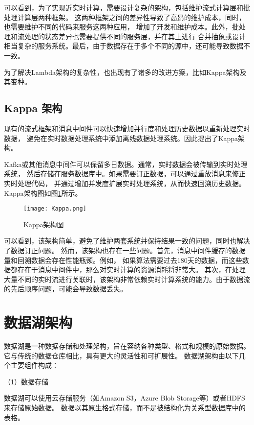可以看到，为了实现近实时计算，需要设计复杂的架构，包括维护流式计算层和批处理计算层两种框架。
这两种框架之间的差异性导致了高昂的维护成本，同时，也需要维护不同的代码来服务这两种应用，
增加了开发和维护成本。此外，批处理和流处理的状态差异也需要提供不同的服务层，并在其上进行
合并抽象或设计相当复杂的服务系统。最后，由于数据存在于多个不同的源中，还可能导致数据不一致。

为了解决Lambda架构的复杂性，也出现有了诸多的改进方案，比如Kappa架构及其变种。

\subsection{Kappa 架构}

现有的流式框架和消息中间件可以快速增加并行度和处理历史数据以重新处理实时数据，
避免在实时数据处理系统中添加离线数据处理系统。因此提出了Kappa架构\cite{4}。

Kafka或其他消息中间件可以保留多日数据。通常，实时数据会被传输到实时处理系统，
然后存储在服务数据库中。如果需要订正数据，可以通过重放消息来修正实时处理代码，
并通过增加并发度扩展实时处理系统，从而快速回溯历史数据。Kappa架构图如图\ref{fig:Kappa架构图}所示。

\begin{figure}[H]
  \centering
  \texttt{[image: Kappa.png]}
  \caption{Kappa架构图}
  \label{fig:Kappa架构图}
\end{figure}

可以看到，该架构简单，避免了维护两套系统并保持结果一致的问题，同时也解决了数据订正问题。
然而，该架构也存在一些问题。首先，消息中间件缓存的数据量和回溯数据会存在性能瓶颈。例如，
如果算法需要过去180天的数据，而这些数据都存在于消息中间件中，那么对实时计算的资源消耗将非常大。
其次，在处理大量不同的实时流进行关联时，该架构非常依赖实时计算系统的能力。由于数据流的先后顺序问题，可能会导致数据丢失。

\section{数据湖架构}

数据湖是一种数据存储和处理架构，旨在容纳各种类型、格式和规模的原始数据\cite{12,14}。它与传统的数据仓库相比，具有更大的灵活性和可扩展性\cite{28,29}。
数据湖架构由以下几个主要组件构成：

（1）数据存储

数据湖可以使用云存储服务（如Amazon S3，Azure Blob Storage等）或者HDFS来存储原始数据。
数据以其原生格式存储，而不是被结构化为关系型数据库中的表格。

